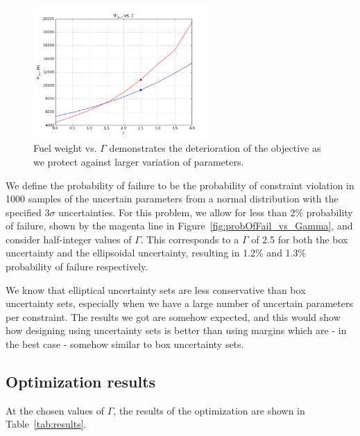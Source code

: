 \documentclass{article}
\begin{document}
\begin{figure}
\centering
\includegraphics[width=0.6\textwidth]{W_f_vs_Gamma.png}
\caption{Fuel weight vs. $\Gamma$ demonstrates the deterioration of the objective as we protect against larger variation of parameters.}
\label{fig:W_f_vs_Gamma}
\end{figure}

We define the probability of failure to be the probability of constraint violation in 1000 samples of the uncertain parameters from a normal distribution with the specified $3\sigma$ uncertainties. For this problem, we allow for less than 2\% probability of failure, shown by the magenta line in Figure~\ref{fig:probOfFail_vs_Gamma}, and consider half-integer values of $\Gamma$. This corresponds to a $\Gamma$ of 2.5 for both the box uncertainty and the ellipsoidal uncertainty, resulting in 1.2\% and 1.3\% probability of failure respectively.

We know that elliptical uncertainty sets are less conservative than box uncertainty sets, especially when we have a large number of uncertain parameters per constraint. The results we got are somehow expected, and this would show how designing using uncertainty sets is better than using margins which are - in the best case - somehow similar to box uncertainty sets.

\subsection{Optimization results}

At the chosen values of $\Gamma$, the results of the optimization are shown in Table~\ref{tab:results}.
\end{document}
